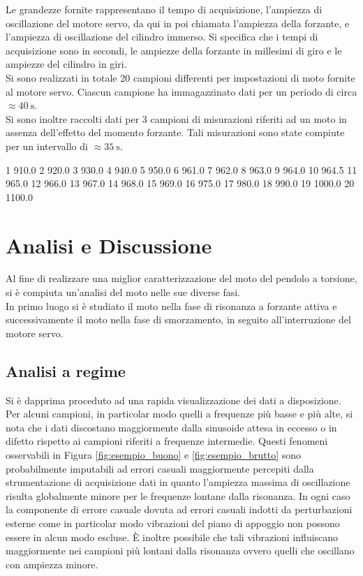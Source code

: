 \documentclass[a4paper,11pt,oneside]{article}
\begin{document}
Le grandezze fornite rappresentano il tempo di acquisizione, l'ampiezza di oscillazione del motore servo, da qui in poi chiamata l'ampiezza della forzante, e l'ampiezza di oscillazione del cilindro immerso. Si specifica che i tempi di acquisizione sono in secondi, le ampiezze della forzante in millesimi di giro e le ampiezze del cilindro in giri.\\
Si sono realizzati in totale 20 campioni differenti per impostazioni di moto fornite al  motore servo. Ciascun campione ha immagazzinato dati per un periodo di circa $\approx \SI{40}{\second}$.\\
Si sono inoltre raccolti dati per 3 campioni di misurazioni riferiti ad un moto in assenza dell'effetto del momento forzante. Tali misurazioni sono state compiute per un intervallo di $\approx  \SI{35}{\second}$.


1 910.0
2 920.0
3  930.0
4 940.0
5 950.0
6 961.0
7 962.0
8 963.0
9 964.0
10 964.5
11 965.0
12 966.0
13 967.0
14 968.0
15 969.0
16 975.0
17 980.0
18 990.0
19 1000.0
20 1100.0

\section{Analisi e Discussione}
Al fine di realizzare una miglior caratterizzazione del moto del pendolo a torsione, si è compiuta un'analisi del moto nelle sue diverse fasi.\\
In primo luogo si è studiato il moto nella fase di risonanza a forzante attiva e successivamente il moto nella fase di smorzamento, in seguito all'interruzione del motore servo.

\subsection{Analisi a regime}
Si è dapprima proceduto ad una rapida visualizzazione dei dati a disposizione.
Per alcuni campioni, in particolar modo quelli a frequenze più basse e più alte, si nota che i dati discostano maggiormente dalla sinusoide attesa in eccesso o in difetto rispetto ai campioni riferiti a frequenze intermedie.
Questi fenomeni osservabili in Figura \ref{fig:esempio_buono} e \ref{fig:esempio_brutto} sono probabilmente imputabili ad errori casuali maggiormente percepiti dalla strumentazione di acquisizione dati in quanto l'ampiezza massima di oscillazione risulta globalmente minore per le frequenze lontane dalla risonanza.
In ogni caso la componente di errore casuale dovuta ad errori casuali indotti da perturbazioni esterne come in particolar modo vibrazioni del piano di appoggio non possono essere in alcun modo escluse. È inoltre possibile che tali vibrazioni influiscano maggiormente nei campioni più lontani dalla risonanza ovvero quelli che oscillano con ampiezza minore.
\end{document}
